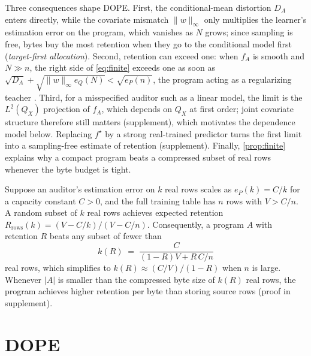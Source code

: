 Three consequences shape DOPE. First, the conditional-mean distortion $D_A$ enters directly, while
the covariate mismatch $\lVert w\rVert_\infty$ only multiplies the learner's estimation error on the
program, which vanishes as $N$ grows; since sampling is free, bytes buy the most retention when
they go to the conditional model first (\emph{target-first allocation}). Second, retention can
exceed one: when $f_A$ is smooth and $N\gg n$, the right side of \eqref{eq:finite} exceeds one as
soon as $\sqrt{D_A}+\sqrt{\lVert w\rVert_\infty e_Q(N)}<\sqrt{e_P(n)}$, the program acting as a
regularizing teacher \citep{hinton2015distilling}. Third, for a misspecified auditor such as a linear
model, the limit is the $L^2(Q_X)$ projection of $f_A$, which depends on $Q_X$ at first order; joint
covariate structure therefore still matters (supplement), which motivates the dependence model below. Replacing
$f^\star$ by a strong real-trained predictor turns the first limit into a sampling-free estimate of
retention (supplement). Finally, \cref{prop:finite} explains why a compact program beats a compressed
subset of real rows whenever the byte budget is tight.

\begin{proposition}
\label{prop:crossover}
Suppose an auditor's estimation error on $k$ real rows scales as $e_P(k)=C/k$ for a capacity constant
$C>0$, and the full training table has $n$ rows with $V>C/n$. A random subset of $k$ real rows achieves
expected retention $R_{\mathrm{rows}}(k)=(V-C/k)/(V-C/n)$. Consequently, a program $A$ with retention $R$
beats any subset of fewer than
\begin{equation}
  k(R) \;=\; \frac{C}{(1-R)V + R\,C/n}
  \label{eq:crossover}
\end{equation}
real rows, which simplifies to $k(R)\approx (C/V)/(1-R)$ when $n$ is large. Whenever $|A|$ is smaller than
the compressed byte size of $k(R)$ real rows, the program achieves higher retention per byte than storing
source rows (proof in supplement).
\end{proposition}

\section{DOPE}
\label{sec:method}

